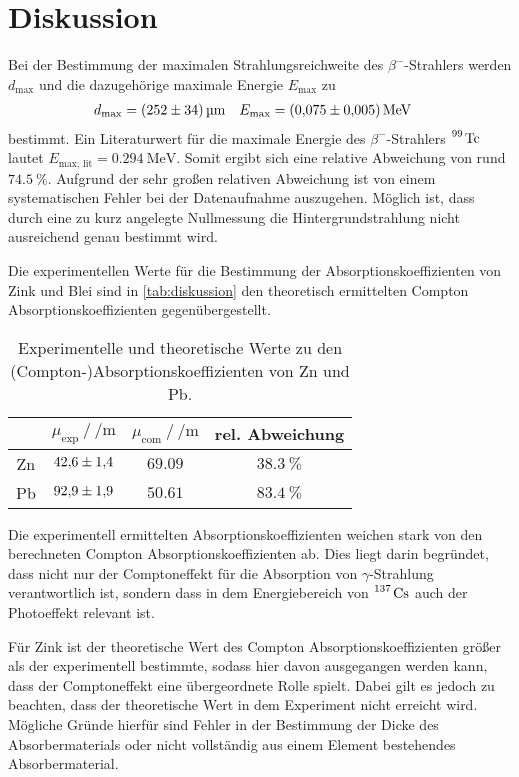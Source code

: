 \section{Diskussion}
\label{sec:Diskussion}
Bei der Bestimmung der maximalen Strahlungsreichweite des $\beta^{-}$-Strahlers werden $d_{\text{max}}$ 
und die dazugehörige maximale Energie $E_{\text{max}}$ zu
\begin{align*}
    d_{\text{max}} &= \qty{252+-34}{\micro\metre} & E_{\text{max}} &= \qty{0.075+-0.005}{\mega\electronvolt}
\end{align*}
bestimmt. Ein Literaturwert für die maximale Energie des $\beta^{-}$-Strahlers $\ce{^99 Tc}$ lautet 
$E_{\text{max, lit}} = \qty{0,294}{\mega\electronvolt}$. Somit ergibt sich eine relative Abweichung von
rund $\qty{74,5}{\percent}$.
Aufgrund der sehr großen relativen Abweichung ist von einem systematischen Fehler bei der Datenaufnahme auszugehen.
Möglich ist, dass durch eine zu kurz angelegte Nullmessung die Hintergrundstrahlung nicht ausreichend genau 
bestimmt wird.

Die experimentellen Werte für die Bestimmung der Absorptionskoeffizienten von Zink und Blei sind in 
\autoref{tab:diskussion} den theoretisch ermittelten Compton Absorptionskoeffizienten gegenübergestellt.

\begin{table} [H]
    \centering
    \caption{Experimentelle und theoretische Werte zu den (Compton-)Absorptionskoeffizienten von Zn und Pb.}
    \label{tab:diskussion}
    \begin{tabular}{S S S S}
      \toprule
      {} & {$\mu_{\text{exp}} \mathbin{/} \unit{\per\metre}$} & {$\mu_{\text{com}} \mathbin{/} \unit{\per\metre}$} & {rel. Abweichung}  \\
      \midrule
      {Zn} & $\num{42.6+-1.4}$ & $\num{69,09}$ & $\qty{38,3}{\percent}$ \\ 
      {Pb} & $\num{92.9+-1.9}$ & $\num{50,61}$ & $\qty{83,4}{\percent}$ \\
      \bottomrule
    \end{tabular}
\end{table}

Die experimentell ermittelten Absorptionskoeffizienten weichen stark von den berechneten Compton Absorptionskoeffizienten
ab. Dies liegt darin begründet, dass nicht nur der Comptoneffekt für die Absorption von $\gamma$-Strahlung verantwortlich
ist, sondern dass in dem Energiebereich von $\ce{^137 Cs}$ auch der Photoeffekt relevant ist.

Für Zink ist der theoretische Wert des Compton Absorptionskoeffizienten größer als der experimentell bestimmte, 
sodass hier davon ausgegangen werden kann, dass der Comptoneffekt eine übergeordnete Rolle spielt.
Dabei gilt es jedoch zu beachten, dass der theoretische Wert in dem Experiment nicht erreicht wird. Mögliche 
Gründe hierfür sind Fehler in der Bestimmung der Dicke des Absorbermaterials oder nicht vollständig aus einem 
Element bestehendes Absorbermaterial.

